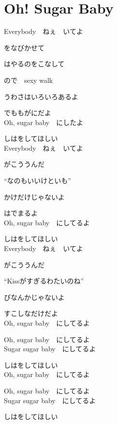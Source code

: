 \section{ Oh! Sugar Baby}
\large{

Everybody　ねぇ　いてよ

をなびかせて

はやるのをこなして

ので　sexy walk

うわさはいろいろあるよ

でももがにだよ
\\

Oh, sugar baby　にしたよ

しはをしてほしい
\\

Everybody　ねぇ　いてよ

がこううんだ

“なのもいいけといも”

かけだけじゃないよ

はでまるよ
\\

Oh, sugar baby　にしてるよ

しはをしてほしい
\\

Everybody　ねぇ　いてよ

がこううんだ

“Kissがすぎるわたいのね”

びなんかじゃないよ

すこしなだけだよ
\\

Oh, sugar baby　にしてるよ

Oh, sugar baby　にしてるよ
\\

Sugar sugar baby　にしてるよ

しはをしてほしい
\\

Oh, sugar baby　にしてるよ

Oh, sugar baby　にしてるよ
\\

Sugar sugar baby　にしてるよ

しはをしてほしい

}